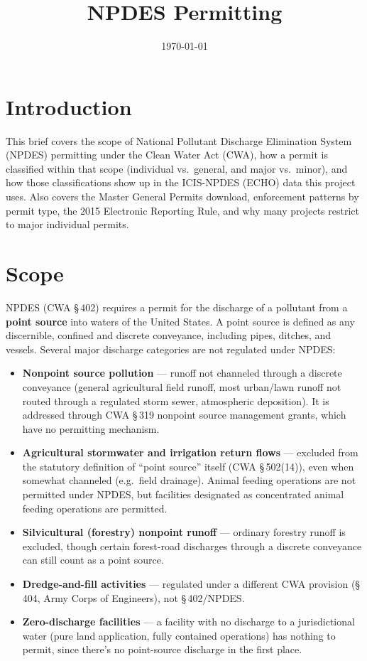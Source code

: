 \documentclass[11pt]{article}
\title{\vspace{-2.5em}NPDES Permitting}
\author{}
\date{\today}
\begin{document}
\sloppy
\maketitle
\vspace{-2.5em}

\section*{Introduction}
This brief covers the scope of National Pollutant Discharge Elimination System
(NPDES) permitting under the Clean Water Act (CWA), how a permit is classified
within that scope (individual vs.\ general, and major vs.\ minor), and how those
classifications show up in the ICIS-NPDES (ECHO) data this project uses. Also
covers the Master General Permits download, enforcement patterns by permit type,
the 2015 Electronic Reporting Rule, and why many projects restrict to major
individual permits.

\section{Scope}

NPDES (CWA \S\,402) requires a permit for the discharge of a pollutant from a
\textbf{point source} into waters of the United States. A point source is defined
as any discernible, confined and discrete conveyance, including pipes, ditches, and
vessels. Several major discharge categories are not regulated under NPDES:

\begin{itemize}
  \item \textbf{Nonpoint source pollution} --- runoff not channeled through a
        discrete conveyance (general agricultural field runoff, most urban/lawn
        runoff not routed through a regulated storm sewer, atmospheric deposition).
        It is addressed through CWA \S\,319 nonpoint source management grants,
        which have no permitting mechanism.
  \item \textbf{Agricultural stormwater and irrigation return flows} --- excluded
        from the statutory definition of ``point source'' itself (CWA
        \S\,502(14)), even when somewhat channeled (e.g.\ field drainage). Animal
        feeding operations are not permitted under NPDES, but facilities
        designated as concentrated animal feeding operations are permitted.
  \item \textbf{Silvicultural (forestry) nonpoint runoff} --- ordinary forestry
        runoff is excluded, though certain forest-road discharges through a
        discrete conveyance can still count as a point source.
  \item \textbf{Dredge-and-fill activities} --- regulated under a different CWA
        provision (\S\,404, Army Corps of Engineers), not \S\,402/NPDES.
  \item \textbf{Zero-discharge facilities} --- a facility with no discharge to a
        jurisdictional water (pure land application, fully contained operations)
        has nothing to permit, since there's no point-source discharge in the
        first place.
\end{itemize}
\end{document}
